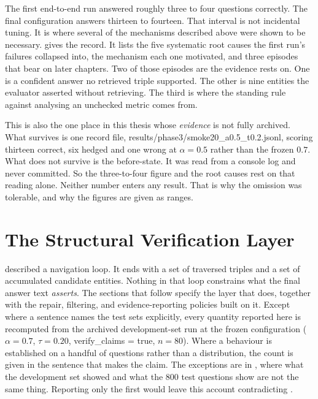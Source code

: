 The first end-to-end run answered roughly three to four questions correctly. The
final configuration answers thirteen to fourteen. That interval is not
incidental tuning. It is where several of the mechanisms described above were
shown to be necessary.  gives the record. It lists the five
systematic root causes the first run's failures collapsed into, the mechanism
each one motivated, and three episodes that bear on later chapters. Two of those
episodes are the evidence  rests on. One is a
confident answer no retrieved triple supported. The other is nine entities the
evaluator asserted without retrieving. The third is where the standing rule
against analysing an unchecked metric comes from.

This is also the one place in this thesis whose \emph{evidence} is not fully
archived. What survives is one record file,
\textsf{results/phase3/smoke20\_a0.5\_t0.2.jsonl}, scoring thirteen correct, six
hedged and one wrong at $\alpha = 0.5$ rather than the frozen $0.7$. What does
not survive is the before-state. It was read from a console log and never
committed. So the three-to-four figure and the root causes rest on that reading
alone. Neither number enters any result. That is why the omission was tolerable,
and why the figures are given as ranges.

\section{The Structural Verification Layer}\label{sec:verification-layer}

 described a navigation loop. It ends with a set of
traversed triples and a set of accumulated candidate entities. Nothing in that
loop constrains what the final answer text \emph{asserts}. The sections that
follow specify the layer that does, together with the repair, filtering, and
evidence-reporting policies built on it. Except where a sentence names the test
sets explicitly, every quantity reported here is recomputed from the archived
development-set run at the frozen configuration ($\alpha = 0.7$, $\tau = 0.20$,
\textsf{verify\_claims} = true, $n = 80$). Where a behaviour is established on a
handful of questions rather than a distribution, the count is given in the
sentence that makes the claim. The exceptions are in , where
what the development set showed and what the $800$ test questions show are not
the same thing. Reporting only the first would leave this account contradicting
.

